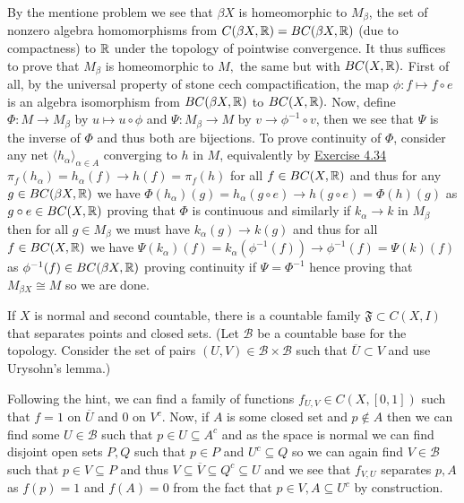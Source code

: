 \documentclass[12pt,a4paper]{article}
\begin{document}
\begin{solution}
    By the mentione problem we see that $\beta X$ is homeomorphic to $M_\beta$, the set of nonzero algebra homomorphisms from $C(\beta X,\mathbb{R})=BC(\beta X,\mathbb{R})$ (due to compactness) to $\mathbb{R}$ under the topology of pointwise convergence. 
    It thus suffices to prove that $M_\beta$ is homeomorphic to $M,$ the same but with $BC(X,\mathbb{R}).$ 
    First of all, by the universal property of stone cech compactification, the map $\phi:f\mapsto f\circ e$ is an algebra isomorphism from $BC(\beta X,\mathbb{R})$ to $BC(X,\mathbb{R}).$ 
    Now, define $\Phi:M\to M_\beta$ by $u\mapsto u\circ \phi$ and $\Psi:M_\beta\to M$ by $v\to\phi^{-1}\circ v$, then we see that $\Psi$ is the inverse of $\Phi$ and thus both are bijections. 
    To prove continuity of $\Phi$, consider any net $\langle h_\alpha\rangle_{\alpha\in A}$ converging to $h$ in $M$, equivalently by \hyperref[prob:4-34]{Exercise 4.34} $\pi_f(h_\alpha)=h_\alpha(f)\to h(f)=\pi_f(h)$ for all $f\in BC(X,\mathbb{R})$ and thus for any $g\in BC(\beta X,\mathbb{R})$ we have $\Phi(h_\alpha)(g)=h_\alpha(g\circ e)\to h(g\circ e)=\Phi(h)(g)$ as $g\circ e\in BC(X,\mathbb{R})$ proving that $\Phi$ is continuous and similarly if $k_\alpha\to k$ in $M_\beta$ then for all $g\in M_\beta$ we must have $k_\alpha(g)\to k(g)$ and thus for all $f\in BC(X,\mathbb{R})$ we have $\Psi(k_\alpha)(f)=k_\alpha(\phi^{-1}(f))\to\phi^{-1}(f)=\Psi(k)(f)$ as $\phi^{-1}(f)\in BC(\beta X,\mathbb{R})$ proving continuity if $\Psi=\Phi^{-1}$ hence proving that $M_{\beta X}\cong M$ so we are done. 
\end{solution}
\begin{problem}\label{prob:4-76}
If $X$ is normal and second countable, there is a countable family $\mathfrak{F} \subset C(X,I)$ that separates points and closed sets. (Let $\mathcal{B}$ be a countable base for the topology. Consider the set of pairs $(U,V) \in \mathcal{B} \times \mathcal{B}$ such that $\overline{U} \subset V$ and use Urysohn's lemma.)
\end{problem}
\begin{solution}
    Following the hint, we can find a family of functions $f_{U,V}\in C(X,[0,1])$ such that $f=1$ on $ \overline{U}$ and $0$ on $V^c$. 
    Now, if $A$ is some closed set and $p\notin A$ then we can find some $U\in\mathcal B$ such that $p\in U \subseteq A^c$ and as the space is normal we can find disjoint open sets $P,Q$ such that $p\in P$ and $U^c \subseteq Q$ so we can again find $V\in\mathcal B$ such that $p\in V \subseteq P$ and thus $V \subseteq\overline{V} \subseteq Q^c \subseteq U$ and we see that $f_{V,U}$ separates $p,A$ as $f(p)=1$ and $f(A)=0$ from the fact that $p\in V, A \subseteq U^c$ by construction. 
\end{solution}
\end{document}
